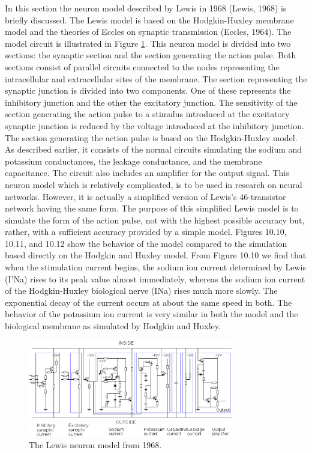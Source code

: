 In this section the neuron model described by Lewis in 1968 (Lewis, 1968) is briefly discussed.
The Lewis model is based on the Hodgkin-Huxley membrane model and the theories of Eccles on 
synaptic transmission (Eccles, 1964). 
The model circuit is illustrated in Figure \ref{fig:lewis_neuron}.
This neuron model is divided into two sections: the synaptic section and the section generating
the action pulse.
Both sections consist of parallel circuits connected to the nodes representing the intracellular 
and extracellular sites of the membrane.
The section representing the synaptic junction is divided into two components. 
One of these represents the inhibitory junction and the other the excitatory junction. 
The sensitivity of the section generating the action pulse to a stimulus introduced at
the excitatory synaptic junction is reduced by the voltage introduced at the inhibitory junction.
The section generating the action pulse is based on the Hodgkin-Huxley model.
As described earlier, it consists of the normal circuits simulating the sodium and potassium 
conductances, the leakage conductance, and the membrane capacitance.
The circuit also includes an amplifier for the output signal.
This neuron model which is relatively complicated, is to be used in research on neural networks.
However, it is actually a simplified version of Lewis's 46-transistor network having the same form.
The purpose of this simplified Lewis model is to simulate the form of the action pulse, not with
the highest possible accuracy but, rather, with a sufficient accuracy provided by a simple model.
Figures 10.10, 10.11, and 10.12 show the behavior of the model compared to the simulation based 
directly on the Hodgkin and Huxley model.
From Figure 10.10 we find that when the stimulation current begins, the sodium ion current 
determined by Lewis (I'Na) rises to its peak value almost immediately, whereas the sodium ion
current of the Hodgkin-Huxley biological nerve (INa) rises much more slowly. 
The exponential decay of the current occurs at about the same speed in both. The behavior of the
potassium ion current is very similar in both the model and the biological membrane as simulated 
by Hodgkin and Huxley. 

\begin{figure}[htb] 
	\label{fig:lewis_neuron}
	\centering
	\includegraphics[width=0.8\textwidth]{figures/lewis_neuron}
	\caption{The Lewis neuron model from 1968.}
\end{figure}


